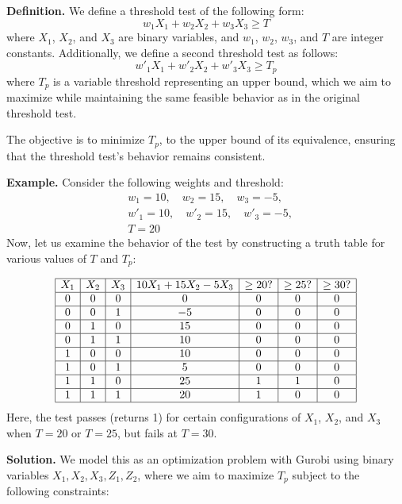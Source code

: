\documentclass[]{article}
\begin{document}
\textbf{Definition.} We define a threshold test of the following form:
\[
w_1 X_1 + w_2 X_2 + w_3 X_3 \ge T
\]
where \(X_1\), \(X_2\), and \(X_3\) are binary variables, and \(w_1\), \(w_2\), \(w_3\), and \(T\) are integer constants. Additionally, we define a second threshold test as follows:
\[
w'_1 X_1 + w'_2 X_2 + w'_3 X_3 \ge T_p
\]
where \( T_p \) is a variable threshold representing an upper bound, which we aim to maximize while maintaining the same feasible behavior as in the original threshold test.

The objective is to minimize \( T_p \), to the upper bound of its equivalence, ensuring that the threshold test's behavior remains consistent.

\textbf{Example.} Consider the following weights and threshold:
\[
\begin{aligned}
    & w_1 = 10, \quad w_2 = 15, \quad w_3 = -5, \\
    & w'_1 = 10, \quad w'_2 = 15, \quad w'_3 = -5, \\
    & T = 20
\end{aligned}
\]
Now, let us examine the behavior of the test by constructing a truth table for various values of \( T \) and \( T_p \):

\[
\begin{array}{|c|c|c|c|c|c|c|}
\hline
X_1 & X_2 & X_3 & 10X_1 + 15X_2 - 5X_3 & \ge 20? & \ge 25? & \ge 30? \\
\hline
0 & 0 & 0 & 0 & 0 & 0 & 0 \\ \hline
0 & 0 & 1 & -5 & 0 & 0 & 0 \\ \hline
0 & 1 & 0 & 15 & 0 & 0 & 0 \\ \hline
0 & 1 & 1 & 10 & 0 & 0 & 0 \\ \hline
1 & 0 & 0 & 10 & 0 & 0 & 0 \\ \hline
1 & 0 & 1 & 5 & 0 & 0 & 0 \\ \hline
1 & 1 & 0 & 25 & 1 & 1 & 0 \\ \hline
1 & 1 & 1 & 20 & 1 & 0 & 0 \\ 
\hline
\end{array}
\]
Here, the test passes (returns 1) for certain configurations of \(X_1\), \(X_2\), and \(X_3\) when \( T = 20 \) or \( T = 25 \), but fails at \( T = 30 \).

\textbf{Solution.} We model this as an optimization problem with Gurobi using binary variables \(X_1, X_2, X_3, Z_1, Z_2\), where we aim to maximize \( T_p \) subject to the following constraints:
\end{document}
